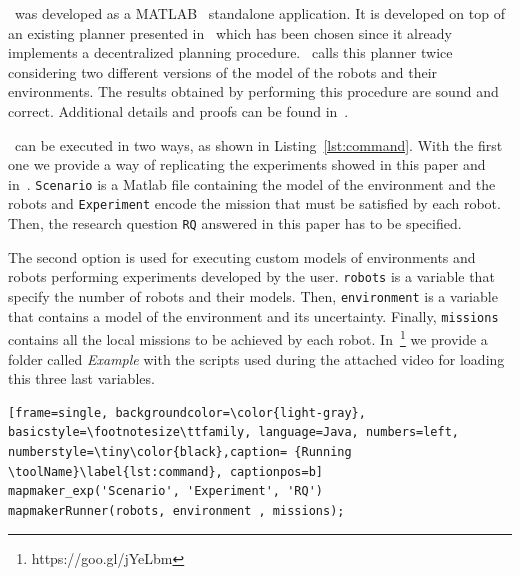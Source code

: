 
\toolName\  was developed as a  MATLAB~\cite{matlab} standalone application.
It is developed on top of an existing  planner presented in~\cite{tumova2016multi} which has been chosen since it already implements a decentralized planning procedure.
\toolName\ calls this planner twice considering two different versions of the model of the robots and their environments. 
The results obtained by performing this procedure are sound and correct.
Additional details and proofs can be found in~\cite{mapmaker17}.


\toolName\ can be executed in two ways, as shown in Listing~\ref{lst:command}.
With the first one we provide a way of replicating the experiments showed in this paper and in~\cite{mapmaker17}.
\texttt{Scenario} is a Matlab file containing the model of the environment and the robots and \texttt{Experiment} encode the mission that must be satisfied by each robot.
Then, the research question \texttt{RQ} answered in this paper has to be specified.

The second option is used for executing custom models of environments and robots performing experiments developed by the user.
\texttt{robots} is a variable that specify the number of robots and their models.
Then, \texttt{environment} is a variable that contains a model of the environment and its uncertainty.
Finally, \texttt{missions} contains all the local missions to be achieved by each robot.
In~\footnote{https://goo.gl/jYeLbm} we provide a folder called \emph{Example} with the scripts used during the attached video for loading this three last variables.

\begin{lstlisting}[frame=single, backgroundcolor=\color{light-gray}, basicstyle=\footnotesize\ttfamily, language=Java, numbers=left, numberstyle=\tiny\color{black},caption= {Running \toolName}\label{lst:command}, captionpos=b]
mapmaker_exp('Scenario', 'Experiment', 'RQ')
mapmakerRunner(robots, environment , missions);
\end{lstlisting}






